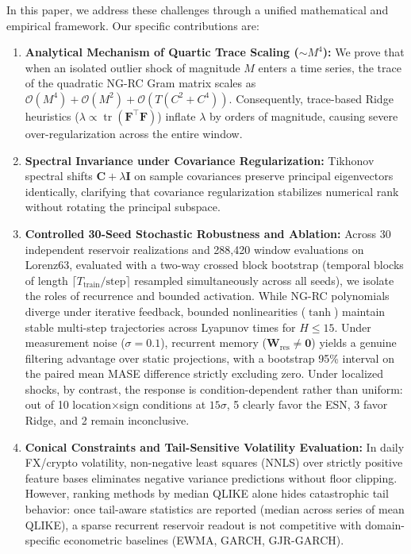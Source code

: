 \documentclass[aip,cha,reprint,amsmath,amssymb]{revtex4-2}
\begin{document}
In this paper, we address these challenges through a unified mathematical and empirical framework. Our specific contributions are:
\begin{enumerate}
    \item \textbf{Analytical Mechanism of Quartic Trace Scaling ($\sim M^4$):} We prove that when an isolated outlier shock of magnitude $M$ enters a time series, the trace of the quadratic NG-RC Gram matrix scales as $\mathcal{O}(M^4) + \mathcal{O}(M^2) + \mathcal{O}(T(C^2+C^4))$. Consequently, trace-based Ridge heuristics ($\lambda \propto \operatorname{tr}(\mathbf{F}^\top\mathbf{F})$) inflate $\lambda$ by orders of magnitude, causing severe over-regularization across the entire window.
    \item \textbf{Spectral Invariance under Covariance Regularization:} Tikhonov spectral shifts $\mathbf{C} + \lambda\mathbf{I}$ on sample covariances preserve principal eigenvectors identically, clarifying that covariance regularization stabilizes numerical rank without rotating the principal subspace.
    \item \textbf{Controlled 30-Seed Stochastic Robustness and Ablation:} Across 30 independent reservoir realizations and 288,420 window evaluations on Lorenz63, evaluated with a two-way crossed block bootstrap (temporal blocks of length $\lceil T_{\text{train}}/\text{step}\rceil$ resampled simultaneously across all seeds), we isolate the roles of recurrence and bounded activation. While NG-RC polynomials diverge under iterative feedback, bounded nonlinearities ($\tanh$) maintain stable multi-step trajectories across Lyapunov times for $H \le 15$. Under measurement noise ($\sigma=0.1$), recurrent memory ($\mathbf{W}_{\text{res}} \neq \mathbf{0}$) yields a genuine filtering advantage over static projections, with a bootstrap 95\% interval on the paired mean MASE difference strictly excluding zero. Under localized shocks, by contrast, the response is condition-dependent rather than uniform: out of 10 location$\times$sign conditions at $15\sigma$, 5 clearly favor the ESN, 3 favor Ridge, and 2 remain inconclusive.
    \item \textbf{Conical Constraints and Tail-Sensitive Volatility Evaluation:} In daily FX/crypto volatility, non-negative least squares (NNLS) over strictly positive feature bases eliminates negative variance predictions without floor clipping. However, ranking methods by median QLIKE alone hides catastrophic tail behavior: once tail-aware statistics are reported (median across series of mean QLIKE), a sparse recurrent reservoir readout is not competitive with domain-specific econometric baselines (EWMA, GARCH, GJR-GARCH).
\end{enumerate}
\end{document}
